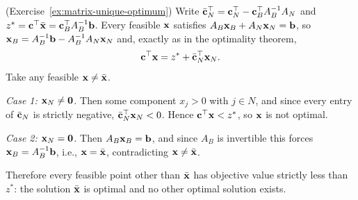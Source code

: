 \begin{solution}(Exercise~\ref{ex:matrix-unique-optimum})
Write \( \bar{\mathbf{c}}_N^\top = \mathbf{c}_N^\top - \mathbf{c}_B^\top A_B^{-1} A_N \) and \( z^* = \mathbf{c}^\top \bar{\mathbf{x}} = \mathbf{c}_B^\top A_B^{-1} \mathbf{b} \).  Every feasible \( \mathbf{x} \) satisfies \( A_B \mathbf{x}_B + A_N \mathbf{x}_N = \mathbf{b} \), so \( \mathbf{x}_B = A_B^{-1}\mathbf{b} - A_B^{-1}A_N \mathbf{x}_N \) and, exactly as in the optimality theorem,
\[
\mathbf{c}^\top \mathbf{x} = z^* + \bar{\mathbf{c}}_N^\top \mathbf{x}_N .
\]
Take any feasible \( \mathbf{x} \neq \bar{\mathbf{x}} \).

\emph{Case 1: \( \mathbf{x}_N \neq \mathbf{0} \).}  Then some component \( x_j > 0 \) with \( j \in N \), and since every entry of \( \bar{\mathbf{c}}_N \) is strictly negative, \( \bar{\mathbf{c}}_N^\top \mathbf{x}_N < 0 \).  Hence \( \mathbf{c}^\top \mathbf{x} < z^* \), so \( \mathbf{x} \) is not optimal.

\emph{Case 2: \( \mathbf{x}_N = \mathbf{0} \).}  Then \( A_B \mathbf{x}_B = \mathbf{b} \), and since \( A_B \) is invertible this forces \( \mathbf{x}_B = A_B^{-1}\mathbf{b} \), i.e., \( \mathbf{x} = \bar{\mathbf{x}} \), contradicting \( \mathbf{x} \neq \bar{\mathbf{x}} \).

Therefore every feasible point other than \( \bar{\mathbf{x}} \) has objective value strictly less than \( z^* \): the solution \( \bar{\mathbf{x}} \) is optimal and no other optimal solution exists.
\end{solution}

